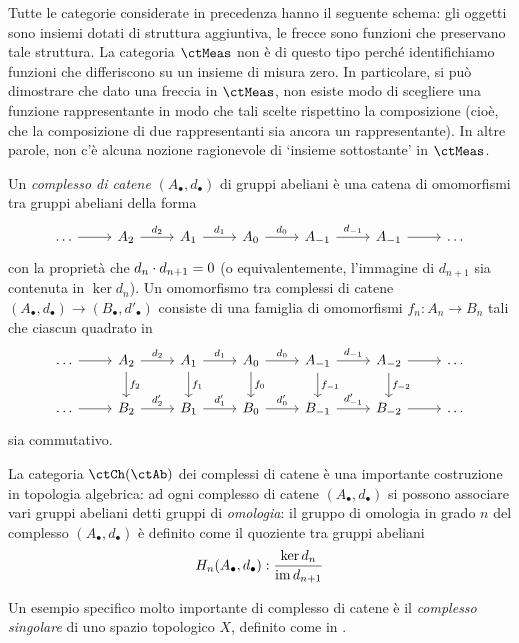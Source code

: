 Tutte le categorie considerate in precedenza hanno il seguente schema: gli oggetti sono insiemi dotati di struttura aggiuntiva, le frecce sono funzioni che preservano tale struttura. La categoria \(\ctMeas\) non è di questo tipo perché identifichiamo funzioni che differiscono su un insieme di misura zero. In particolare, si può dimostrare che dato una freccia in \(\ctMeas\), non esiste modo di scegliere una funzione rappresentante in modo che tali scelte rispettino la composizione (cioè, che la composizione di due rappresentanti sia ancora un rappresentante). In altre parole, non c’è alcuna nozione ragionevole di `insieme sottostante' in \(\ctMeas\).
\begin{example}\label{ex_cat_chcomples}
 Un \emph{complesso di catene} \((A_\bullet, d_\bullet)\) di gruppi abeliani è una catena di omomorfismi tra gruppi abeliani della forma
 \[\begin{tikzcd}
   \dots \ar[r] & A_2 \ar[r, "d_2"] & A_1  \ar[r, "d_1"] & A_0 \ar[r, "d_0"] & A_{-1} \ar[r, "d_{-1}"] & A_{-1} \ar[r] & \dots
  \end{tikzcd}\]
 con la proprietà che \(d_n\cdot d_{n+1}=0\) (o equivalentemente, l'immagine di \(d_{n+1}\) sia contenuta in \(\ker d_n\)). Un omomorfismo tra complessi di catene \((A_\bullet,d_\bullet) \to (B_\bullet,d'_\bullet)\) consiste di una famiglia di omomorfismi \(f_n \colon A_n \to B_n\) tali che ciascun quadrato in
 \[\begin{tikzcd}
   \dots \ar[r] & A_2 \ar[d,"f_2"]\ar[r, "d_2"] & A_1 \ar[d,"f_1"] \ar[r, "d_1"] & A_0 \ar[d,"f_0"]\ar[r, "d_0"] & A_{-1} \ar[d,"f_{-1}"]\ar[r, "d_{-1}"] & A_{-2} \ar[d, "f_{-2}"]\ar[r] & \dots\\
   \dots \ar[r] & B_2 \ar[r, "d_2'"] & B_1  \ar[r, "d_1'"] & B_0 \ar[r, "d_0'"] & B_{-1} \ar[r, "d_{-1}'"] & B_{-2} \ar[r] & \dots
  \end{tikzcd}\]
 sia commutativo.

 La categoria \(\ctCh(\ctAb)\) dei complessi di catene è una importante costruzione in topologia algebrica: ad ogni complesso di catene \((A_\bullet, d_\bullet)\) si possono associare vari gruppi abeliani detti gruppi di \emph{omologia}: il gruppo di omologia in grado \(n\) del complesso \((A_\bullet, d_\bullet)\) è definito come il quoziente tra gruppi abeliani
 \[H_n(A_\bullet, d_\bullet) : \frac{\ker d_n}{\operatorname{im} d_{n+1}}\]

 Un esempio specifico molto importante di complesso di catene è il \emph{complesso singolare} di uno spazio topologico \(X\), definito come in \cite[Cap. 1]{Vick73a}.
\end{example}
